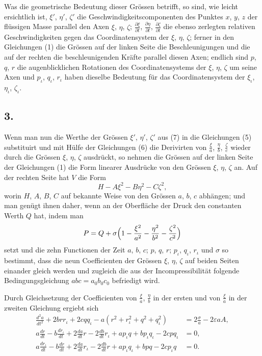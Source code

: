 \documentclass[12pt,a4paper]{book}
\theoremstyle{definition}
\theoremstyle{remark}
\begin{document}
Was die geometrische Bedeutung dieser Grössen betrifft, so sind, wie leicht ersichtlich ist, $\xi'$, $\eta'$, $\zeta'$ die Geschwindigkeitscomponenten des Punktes $x$, $y$, $z$ der flüssigen Masse parallel den Axen $\xi$, $\eta$, $\zeta$; $\frac{\partial \xi}{\partial t}$, $\frac{\partial \eta}{\partial t}$, $\frac{\partial \zeta}{\partial t}$ die ebenso zerlegten relativen Geschwindigkeiten gegen das Coordinatensystem der $\xi$, $\eta$, $\zeta$; ferner in den Gleichungen (1) die Grössen auf der linken Seite die Beschleunigungen und die auf der rechten die beschleunigenden Kräfte parallel diesen Axen; endlich sind $p$, $q$, $r$ die augenblicklichen Rotationen des Coordinatensystems der $\xi$, $\eta$, $\zeta$ um seine Axen und $p_\iota$, $q_\iota$, $r_\iota$ haben dieselbe Bedeutung für das Coordinatensystem der $\xi_\iota$, $\eta_\iota$, $\zeta_\iota$.

\subsection*{3.}

Wenn man nun die Werthe der Grössen $\xi'$, $\eta'$, $\zeta'$ aus (7) in die Gleichungen (5) substituirt und mit Hülfe der Gleichungen (6) die Derivirten von $\frac{\xi}{a}$, $\frac{\eta}{b}$, $\frac{\zeta}{c}$ wieder durch die Grössen $\xi$, $\eta$, $\zeta$ ausdrückt, so nehmen die Grössen auf der linken Seite der Gleichungen (1) die Form linearer Ausdrücke von den Grössen $\xi$, $\eta$, $\zeta$ an. Auf der rechten Seite hat $V$ die Form
\[
H - A\xi^2 - B\eta^2 - C\zeta^2,
\]
worin $H$, $A$, $B$, $C$ auf bekannte Weise von den Grössen $a$, $b$, $c$ abhängen; und man genügt ihnen daher, wenn an der Oberfläche der Druck den constanten Werth $Q$ hat, indem man
\[
P = Q + \sigma\Bigl(1 - \frac{\xi^2}{a^2} - \frac{\eta^2}{b^2} - \frac{\zeta^2}{c^2}\Bigr)
\]
setzt und die zehn Functionen der Zeit $a$, $b$, $c$; $p$, $q$, $r$; $p_\iota$, $q_\iota$, $r_\iota$ und $\sigma$ so bestimmt, dass die neun Coefficienten der Grössen $\xi$, $\eta$, $\zeta$ auf beiden Seiten einander gleich werden und zugleich die aus der Incompressibilität folgende Bedingungsgleichung $abc = a_0b_0c_0$ befriedigt wird.

\newpage

Durch Gleichsetzung der Coefficienten von $\frac{\xi}{a}$, $\frac{\eta}{b}$ in der ersten und von $\frac{\xi}{a}$ in der zweiten Gleichung ergiebt sich
\begin{align*}
\frac{d^2a}{dt^2} + 2brr_\iota + 2cqq_\iota - a(r^2 + r_\iota^2 + q^2 + q_\iota^2) &= 2\frac{\sigma}{a} - 2\varepsilon aA,\\
a\frac{dr}{dt} - b\frac{dr_\iota}{dt} + 2\frac{da}{dt}r - 2\frac{db}{dt}r_\iota + ap_\iota q + bp_\iota q_\iota - 2cpq_\iota &= 0,\\
a\frac{dr_\iota}{dt} - b\frac{dr}{dt} + 2\frac{da}{dt}r_\iota - 2\frac{db}{dt}r + ap_\iota q_\iota + bpq - 2cp_\iota q &= 0.
\end{align*}
\end{document}
